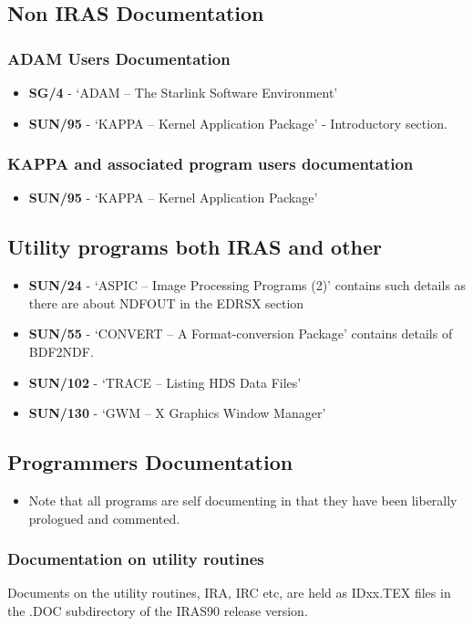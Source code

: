 \documentclass[twoside,11pt]{article}
\newcommand{\xref}[3]{#1}
\begin{document}
\subsection{Non IRAS Documentation}
\subsubsection{ADAM Users Documentation}
\begin{itemize}
\item {\bf \xref{SG/4}{sg4}{}} - `ADAM -- The Starlink Software Environment' 
\item {\bf \xref{SUN/95}{sun95}{}} - `KAPPA -- Kernel Application
Package' - Introductory section. 
\end{itemize}
\subsubsection{KAPPA and associated program users documentation}
\begin{itemize}
\item {\bf \xref{SUN/95}{sun95}{}} - `KAPPA -- Kernel Application Package' 
\end{itemize}
\subsection{Utility programs both IRAS and other}
\begin{itemize}
\item {\bf SUN/24} - `ASPIC -- Image Processing Programs (2)' contains such
details as there are about NDFOUT in the EDRSX section
\item {\bf \xref{SUN/55}{sun55}{}} - `CONVERT -- A Format-conversion Package' 
contains details of BDF2NDF.
\item {\bf \xref{SUN/102}{sun102}{}} - `TRACE -- Listing HDS Data Files'
\item {\bf \xref{SUN/130}{sun130}{}} - `GWM -- X Graphics Window Manager'
\end{itemize}

\subsection{Programmers Documentation}
\begin{itemize}
\item Note that all programs are self documenting in that they have been 
liberally prologued and commented.
\end{itemize}
\subsubsection{Documentation on utility routines}
Documents on the utility routines, IRA, IRC etc, are held as IDxx.TEX files
in the .DOC subdirectory of the IRAS90 release version. 
\end{document}

